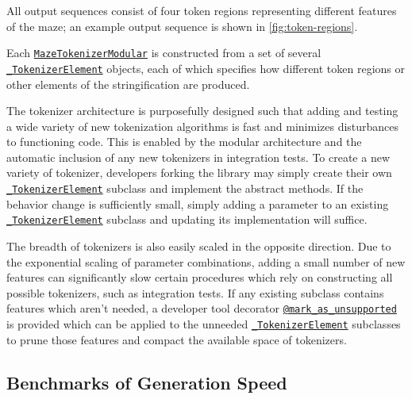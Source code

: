 \documentclass[10pt,a4paper,onecolumn]{article}
\begin{document}
All output sequences consist of four token regions representing
different features of the maze; an example output sequence is shown in
\autoref{fig:token-regions}.



Each
\href{https://understanding-search.github.io/maze-dataset/maze_dataset/tokenization.html\#MazeTokenizerModular}{\texttt{MazeTokenizerModular}}
is constructed from a set of several
\href{https://understanding-search.github.io/maze-dataset/maze_dataset/tokenization.html\#_TokenizerElement}{\texttt{\_TokenizerElement}}
objects, each of which specifies how different token regions or other
elements of the stringification are produced.



The tokenizer architecture is purposefully designed such that adding and
testing a wide variety of new tokenization algorithms is fast and
minimizes disturbances to functioning code. This is enabled by the
modular architecture and the automatic inclusion of any new tokenizers
in integration tests. To create a new variety of tokenizer, developers
forking the library may simply create their own
\href{https://understanding-search.github.io/maze-dataset/maze_dataset/tokenization.html\#_TokenizerElement}{\texttt{\_TokenizerElement}}
subclass and implement the abstract methods. If the behavior change is
sufficiently small, simply adding a parameter to an existing
\href{https://understanding-search.github.io/maze-dataset/maze_dataset/tokenization.html\#_TokenizerElement}{\texttt{\_TokenizerElement}}
subclass and updating its implementation will suffice.

The breadth of tokenizers is also easily scaled in the opposite
direction. Due to the exponential scaling of parameter combinations,
adding a small number of new features can significantly slow certain
procedures which rely on constructing all possible tokenizers, such as
integration tests. If any existing subclass contains features which
aren't needed, a developer tool decorator
\href{https://understanding-search.github.io/maze-dataset/maze_dataset/tokenization/modular/element_base.html\#mark_as_unsupported}{\texttt{@mark\_as\_unsupported}}
is provided which can be applied to the unneeded
\href{https://understanding-search.github.io/maze-dataset/maze_dataset/tokenization.html\#_TokenizerElement}{\texttt{\_TokenizerElement}}
subclasses to prune those features and compact the available space of
tokenizers.

\hypertarget{benchmarks}{%
\subsection{Benchmarks of Generation Speed}\label{benchmarks}}
\end{document}
